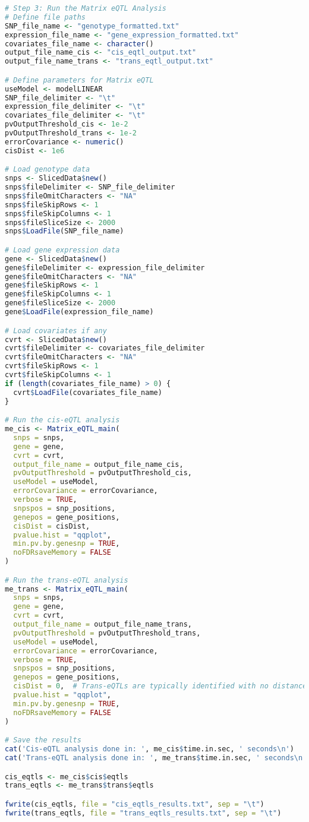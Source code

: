 \documentclass[12pt,a4paper]{article}
\begin{document}
\begin{lstlisting}[language=R]
# Step 3: Run the Matrix eQTL Analysis
# Define file paths
SNP_file_name <- "genotype_formatted.txt"
expression_file_name <- "gene_expression_formatted.txt"
covariates_file_name <- character()
output_file_name_cis <- "cis_eqtl_output.txt"
output_file_name_trans <- "trans_eqtl_output.txt"

# Define parameters for Matrix eQTL
useModel <- modelLINEAR
SNP_file_delimiter <- "\t"
expression_file_delimiter <- "\t"
covariates_file_delimiter <- "\t"
pvOutputThreshold_cis <- 1e-2
pvOutputThreshold_trans <- 1e-2
errorCovariance <- numeric()
cisDist <- 1e6

# Load genotype data
snps <- SlicedData$new()
snps$fileDelimiter <- SNP_file_delimiter
snps$fileOmitCharacters <- "NA"
snps$fileSkipRows <- 1
snps$fileSkipColumns <- 1
snps$fileSliceSize <- 2000
snps$LoadFile(SNP_file_name)

# Load gene expression data
gene <- SlicedData$new()
gene$fileDelimiter <- expression_file_delimiter
gene$fileOmitCharacters <- "NA"
gene$fileSkipRows <- 1
gene$fileSkipColumns <- 1
gene$fileSliceSize <- 2000
gene$LoadFile(expression_file_name)

# Load covariates if any
cvrt <- SlicedData$new()
cvrt$fileDelimiter <- covariates_file_delimiter
cvrt$fileOmitCharacters <- "NA"
cvrt$fileSkipRows <- 1
cvrt$fileSkipColumns <- 1
if (length(covariates_file_name) > 0) {
  cvrt$LoadFile(covariates_file_name)
}

# Run the cis-eQTL analysis
me_cis <- Matrix_eQTL_main(
  snps = snps,
  gene = gene,
  cvrt = cvrt,
  output_file_name = output_file_name_cis,
  pvOutputThreshold = pvOutputThreshold_cis,
  useModel = useModel,
  errorCovariance = errorCovariance,
  verbose = TRUE,
  snpspos = snp_positions,
  genepos = gene_positions,
  cisDist = cisDist,
  pvalue.hist = "qqplot",
  min.pv.by.genesnp = TRUE,
  noFDRsaveMemory = FALSE
)

# Run the trans-eQTL analysis
me_trans <- Matrix_eQTL_main(
  snps = snps,
  gene = gene,
  cvrt = cvrt,
  output_file_name = output_file_name_trans,
  pvOutputThreshold = pvOutputThreshold_trans,
  useModel = useModel,
  errorCovariance = errorCovariance,
  verbose = TRUE,
  snpspos = snp_positions,
  genepos = gene_positions,
  cisDist = 0,  # Trans-eQTLs are typically identified with no distance constraint
  pvalue.hist = "qqplot",
  min.pv.by.genesnp = TRUE,
  noFDRsaveMemory = FALSE
)

# Save the results
cat('Cis-eQTL analysis done in: ', me_cis$time.in.sec, ' seconds\n')
cat('Trans-eQTL analysis done in: ', me_trans$time.in.sec, ' seconds\n')

cis_eqtls <- me_cis$cis$eqtls
trans_eqtls <- me_trans$trans$eqtls

fwrite(cis_eqtls, file = "cis_eqtls_results.txt", sep = "\t")
fwrite(trans_eqtls, file = "trans_eqtls_results.txt", sep = "\t")
\end{lstlisting}
\end{document}
